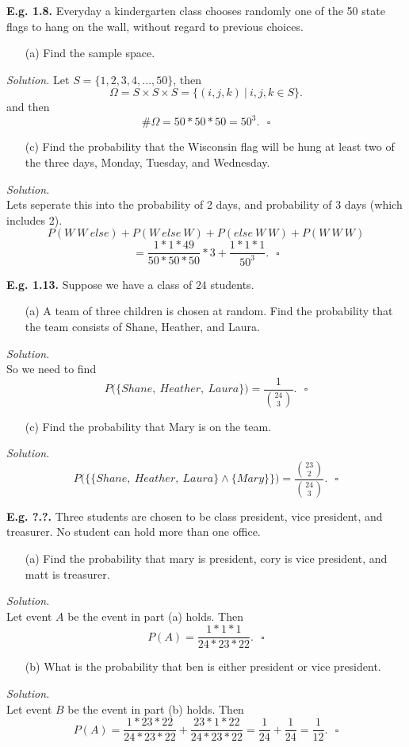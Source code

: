 \documentclass[12pt]{book}
\begin{document}
\noindent \textbf{E.g. 1.8. } Everyday a kindergarten class chooses randomly one of the 50 state flags to hang on the wall, without regard to previous choices.
\begin{itemize}\item [(a)] Find the sample space.\end{itemize}
\textit{Solution. } Let $S=\{1,2,3,4,...,50\}$, then 
$$\Omega=S\times S\times S = \big\{(i,j,k) ~\big|~ i,j,k\in S \big\}.$$
and then $$\#\Omega = 50*50*50 = 50^3.~~~\square$$
\begin{itemize}\item [(c)] Find the probability that the Wisconsin flag will be hung at least two of the three days, Monday, Tuesday, and Wednesday.\end{itemize}
\textit{Solution. }\\
Lets seperate this into the probability of 2 days, and probability of 3 days (which includes 2).\\
$$P(W~W~else)+P(W~else~W)+P(else~W~W)+P(W~W~W) $$
$$= \frac{1*1*49}{50*50*50}*3+\frac{1*1*1}{50^3}.~~~\square$$


\noindent \textbf{E.g. 1.13. } Suppose we have a class of $24$ students.
\begin{itemize}\item [(a)] A team of three children is chosen at random. Find the probability that the team consists of Shane, Heather, and Laura.\end{itemize}
\textit{Solution. } \\
So we need to find 
$$P\big(\{Shane, ~Heather, ~Laura\}\big) = \frac{1}{{24 \choose 3}}.~~~\square$$
\begin{itemize}\item [(c)] Find the probability that Mary is on the team.\end{itemize}
\textit{Solution. } 
$$P\Big(\big\{ \{Shane, ~Heather, ~Laura\} \land \{Mary\} \big\}\Big) = \frac{{23\choose 2}}{{24\choose 3}}.~~~\square$$

\noindent \textbf{E.g. ?.?.  } Three students are chosen to be class president, vice president, and treasurer. No student can hold more than one office. \\
\begin{itemize}\item [(a)] Find the probability that mary is president, cory is vice president, and matt is treasurer.\end{itemize}
\textit{Solution. }\\
Let event $A$ be the event in part (a) holds. Then 
$$P(A) = \frac{1*1*1}{24*23*22}.~~~\square$$
\begin{itemize}\item [(b)] What is the probability that ben is either president or vice president.\end{itemize}
\textit{Solution. }\\
Let event $B$ be the event in part (b) holds. Then 
$$P(A) = \frac{1*23*22}{24*23*22} + \frac{23*1*22}{24*23*22} = \frac{1}{24}+\frac{1}{24} = \frac{1}{12}.~~~\square$$
\end{document}
